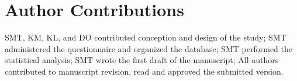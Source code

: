 \section{Author Contributions}

SMT, KM, KL, and DO contributed conception and design of the study; SMT administered the questionnaire and organized the database; SMT performed the statistical analysis; SMT wrote the first draft of the manuscript; All authors contributed to manuscript revision, read and approved the submitted version.

%













